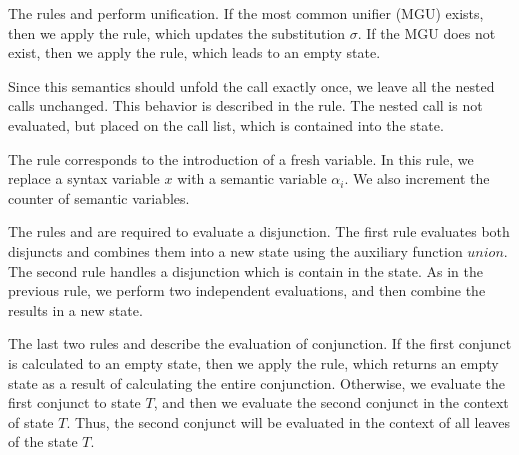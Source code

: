 The rules  and  perform unification. If the most common unifier (MGU) exists, then we apply the  rule, which updates the substitution $\sigma$. If the MGU does not exist, then we apply the  rule, which leads to an empty state.

Since this semantics should unfold the call exactly once, we leave all the nested calls unchanged. This behavior is described in the  rule. The nested call is not evaluated, but placed on the call list, which is contained into the state.

The  rule corresponds to the introduction of a fresh variable. In this rule, we replace a syntax variable $x$ with a semantic variable $\alpha_i$. We also increment the counter of semantic variables.

The rules  and  are required to evaluate a disjunction. The first rule evaluates both disjuncts and combines them into a new state using the auxiliary function $union$. The second rule handles a disjunction which is contain in the state. As in the previous rule, we perform two independent evaluations, and then combine the results in a new state.

The last two rules  and  describe the evaluation of conjunction. If the first conjunct is calculated to an empty state, then we apply the  rule, which returns an empty state as a result of calculating the entire conjunction. Otherwise, we evaluate the first conjunct to state $T$, and then we evaluate the second conjunct in the context of state $T$. Thus, the second conjunct will be evaluated in the context of all leaves of the state $T$.

